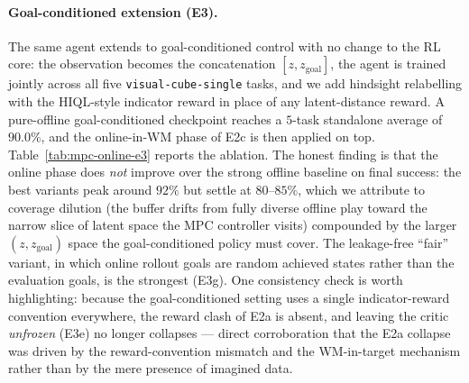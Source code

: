 \paragraph{Goal-conditioned extension (E3).} The same agent extends to goal-conditioned control with no change to the RL core: the observation becomes the concatenation $[z, z_{\text{goal}}]$, the agent is trained jointly across all five \texttt{visual-cube-single} tasks, and we add hindsight relabelling \cite{her} with the HIQL-style indicator reward \cite{park2024hiqlofflinegoalconditionedrl} in place of any latent-distance reward. A pure-offline goal-conditioned checkpoint reaches a $5$-task standalone average of $90.0\%$, and the online-in-WM phase of E2c is then applied on top. Table~\ref{tab:mpc-online-e3} reports the ablation. The honest finding is that the online phase does \emph{not} improve over the strong offline baseline on final success: the best variants peak around $92\%$ but settle at $80$--$85\%$, which we attribute to coverage dilution (the buffer drifts from fully diverse offline play toward the narrow slice of latent space the MPC controller visits) compounded by the larger $(z, z_{\text{goal}})$ space the goal-conditioned policy must cover. The leakage-free ``fair'' variant, in which online rollout goals are random achieved states rather than the evaluation goals, is the strongest (E3g). One consistency check is worth highlighting: because the goal-conditioned setting uses a single indicator-reward convention everywhere, the reward clash of E2a is absent, and leaving the critic \emph{unfrozen} (E3e) no longer collapses --- direct corroboration that the E2a collapse was driven by the reward-convention mismatch and the WM-in-target mechanism rather than by the mere presence of imagined data.

